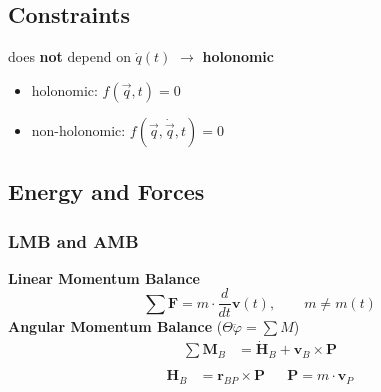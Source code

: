 
\subsection{Constraints}
    does \textbf{not} depend on $\dot{q}(t)$ $\rightarrow$ \textbf{holonomic}
    \begin{itemize}
        \item holonomic: $f(\vec{q},t) = 0$
        \item non-holonomic: $f(\vec{q}, \dot{\vec{q}},t) = 0$
    \end{itemize}
\subsection{Energy and Forces}
    \subsubsection{LMB and AMB}
        \textbf{Linear Momentum Balance}
        $$
            \sum \boldsymbol{F} = m \cdot \frac{d}{dt} \boldsymbol{v}(t), \qquad m \neq m(t)
        $$
        \textbf{Angular Momentum Balance} \hfill ($\Theta \ddot{\varphi} = \sum M$)
        \begin{align*}
            \sum \boldsymbol{M}_B &= \boldsymbol{\dot{H}}_B + \boldsymbol{v}_B \times \boldsymbol{P}\\
        \end{align*}
        \vspace{-3em}
        \begin{align*}
            \boldsymbol{H}_B &= \boldsymbol{r}_{BP} \times \boldsymbol{P} && \boldsymbol{P} = m \cdot \boldsymbol{v}_P
        \end{align*}
